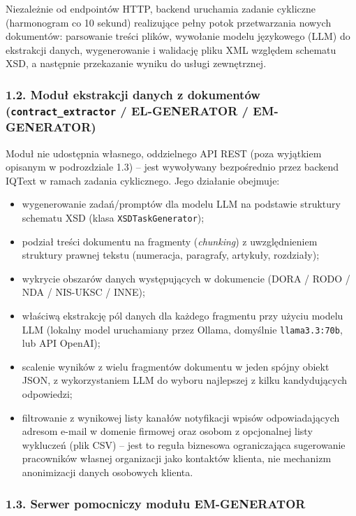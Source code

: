 Niezależnie od endpointów HTTP, backend uruchamia zadanie cykliczne (harmonogram co 10 sekund) realizujące pełny potok przetwarzania nowych dokumentów: parsowanie treści plików, wywołanie modelu językowego (LLM) do ekstrakcji danych, wygenerowanie i walidację pliku XML względem schematu XSD, a następnie przekazanie wyniku do usługi zewnętrznej.



\subsubsection*{1.2. Moduł ekstrakcji danych z dokumentów (\texttt{contract\_extractor} / EL-GENERATOR / EM-GENERATOR)}

Moduł nie udostępnia własnego, oddzielnego API REST (poza wyjątkiem opisanym w podrozdziale 1.3) -- jest wywoływany bezpośrednio przez backend IQText w ramach zadania cyklicznego. Jego działanie obejmuje:

\begin{itemize}
    \item wygenerowanie zadań/promptów dla modelu LLM na podstawie struktury schematu XSD (klasa \texttt{XSDTaskGenerator});
    \item podział treści dokumentu na fragmenty (\emph{chunking}) z uwzględnieniem struktury prawnej tekstu (numeracja, paragrafy, artykuły, rozdziały);
    \item wykrycie obszarów danych występujących w dokumencie (DORA / RODO / NDA / NIS-UKSC / INNE);
    \item właściwą ekstrakcję pól danych dla każdego fragmentu przy użyciu modelu LLM (lokalny model uruchamiany przez Ollama, domyślnie \texttt{llama3.3:70b}, lub API OpenAI);
    \item scalenie wyników z wielu fragmentów dokumentu w jeden spójny obiekt JSON, z wykorzystaniem LLM do wyboru najlepszej z kilku kandydujących odpowiedzi;
    \item filtrowanie z wynikowej listy kanałów notyfikacji wpisów odpowiadających adresom e-mail w domenie firmowej oraz osobom z opcjonalnej listy wykluczeń (plik CSV) -- jest to reguła biznesowa ograniczająca sugerowanie pracowników własnej organizacji jako kontaktów klienta, nie mechanizm anonimizacji danych osobowych klienta.
\end{itemize}


\subsubsection*{1.3. Serwer pomocniczy modułu EM-GENERATOR}

